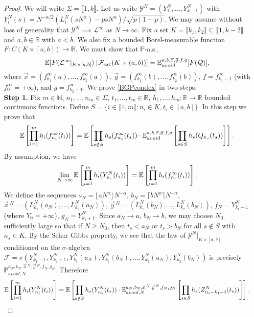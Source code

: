 \begin{proof}
	We will write $\Sigma = \llbracket 1,k\rrbracket$. Let us write $\mathcal{Y}^N = (Y^N_1,\dots,Y^N_{k-1})$ with $Y^N_i(s) = N^{-\alpha/2}(L^N_i(sN^\alpha)-psN^\alpha)/\sqrt{p(1-p)}$. We may assume without loss of generality that $\mathcal{Y}^N \implies \mathcal{L}^\infty$ as $N\to\infty$. Fix a set $K = \llbracket k_1,k_2\rrbracket \subseteq \llbracket 1, k-2\rrbracket$ and $a,b\in\mathbb{R}$ with $a<b$. We also fix a bounded Borel-measurable function $F:C(K\times[a,b])\to\mathbb{R}$. We must show that $\mathbb{P}$-a.s.,
	\begin{equation}\label{BGPcondex}
		\mathbb{E}[F(\mathcal{L}^\infty|_{K\times[a,b]})\,|\,\mathcal{F}_{ext}(K\times(a,b))] = \mathbb{E}^{a,b,\vec{x},\vec{y},f,g}_{avoid}[F(\mathcal{Q})],
	\end{equation}
	where $\vec{x} = (f^\infty_{k_1}(a),\dots,f^\infty_{k_2}(a))$, $\vec{y} = (f^\infty_{k_1}(b),\dots,f^\infty_{k_2}(b))$, $f=f^\infty_{k_1-1}$ (with $f^\infty_0 = +\infty$), and $g=f^\infty_{k_2+1}$. We prove \eqref{BGPcondex} in two steps.\\
	
	\noindent\textbf{Step 1. } Fix $m\in\mathbb{N}$, $n_1,\dots,n_m\in\Sigma$, $t_1,\dots,t_m\in\mathbb{R}$, $h_1,\dots,h_m : \mathbb{R}\to\mathbb{R}$ bounded continuous functions. Define $S = \{i\in\llbracket 1,m\rrbracket : n_i \in K, t_i \in [a,b]\}$. In this step we prove that
	\begin{equation}\label{BBcondexsplit}
		\mathbb{E}\left[\prod_{i=1}^m h_i(f^\infty_{n_i}(t_i))\right] = \mathbb{E}\left[\prod_{s\notin S} h_s(f^\infty_{n_s}(t_s))\cdot\mathbb{E}^{a,b,\vec{x},\vec{y},f,g}_{avoid}\left[\prod_{s\in S} h_s(Q_{n_s}(t_s))\right]\right].
	\end{equation}
	By assumption, we have
	\begin{equation}\label{BGPweak}
		\lim_{N\to\infty}\mathbb{E}\left[\prod_{i=1}^m h_i(Y^N_{n_i}(t_i))\right] = \mathbb{E}\left[\prod_{i=1}^m h_i(f^\infty_{n_i}(t_i))\right].
	\end{equation}
	We define the sequences $a_N = \lfloor aN^\alpha\rfloor N^{-\alpha}$, $b_N = \lceil bN^\alpha\rceil N^{-\alpha}$, $\vec{x}\,^N = (L_{k_1}^N(a_N),\dots,L_{k_2}^N(a_N))$, $\vec{y}\,^N = (L_{k_1}^N(b_N),\dots,L_{k_2}^N(b_N))$, $f_N = Y_{k_1-1}^N$ (where $Y_0 = +\infty$), $g_N = Y_{k_2+1}^N$. Since $a_N \to a$, $b_N\to b$, we may choose $N_0$ sufficiently large so that if $N\geq N_0$, then $t_s < a_N$ or $t_s > b_N$ for all $s\notin S$ with $n_s \in K$. By the Schur Gibbs property, we see that the law of $\mathcal{Y}^N|_{K\times[a,b]}$ conditioned on the $\sigma$-algebra $\mathcal{F} = \sigma\left(Y^N_{k_1-1}, Y^N_{k_2+1}, Y^N_{k_1}(a_N), Y^N_{k_1}(b_N),\dots,Y^N_{k_2}(a_N),Y^N_{k_2}(b_N)\right)$ is precisely $\mathbb{P}^{a_N,b_N,\vec{x}\,^N,\vec{y}\,^N,f_N,g_N}_{avoid,N}$. Therefore
	\begin{equation}\label{BBschur}
		\mathbb{E}\left[\prod_{i=1}^m h_i(Y^N_{n_i}(t_i))\right] = \mathbb{E}\left[\prod_{s\notin S} h_s(Y^N_{n_s}(t_s))\cdot\mathbb{E}^{a_N,b_N,\vec{x}\,^N,\vec{y}\,^N,f_N,g_N}_{avoid,N}\left[\prod_{s\in S} h_s(Z^N_{n_s-k_1+1}(t_s))\right]\right].
	\end{equation}
	

\end{proof}
